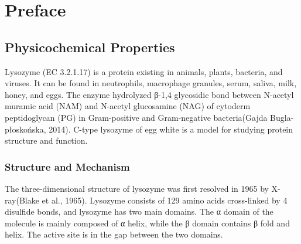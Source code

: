 % 
%
%
% 
%
\chapter{Preface}

\section{Physicochemical Properties}
Lysozyme (EC 3.2.1.17) is a protein existing in animals, plants, bacteria, and viruses. It can be found in neutrophils, macrophage granules, serum, saliva, milk, honey, and eggs. The enzyme hydrolyzed β-1,4 glycosidic bond between N-acetyl muramic acid (NAM) and N-acetyl glucosamine (NAG) of cytoderm peptidoglycan (PG) in Gram-positive and Gram-negative bacteria(Gajda  Bugla-płoskońska, 2014).  C-type lysozyme of egg white is a model for studying protein structure and function. 

\subsection{Structure and Mechanism}

The three-dimensional structure of lysozyme was first resolved in 1965 by X-ray(Blake et al., 1965). Lysozyme consists of 129 amino acids cross-linked by 4 disulfide bonds, and lysozyme has two main domains. The α domain of the molecule is mainly composed of α helix, while the β domain contains β fold and helix. The active site is in the gap between the two domains. 


